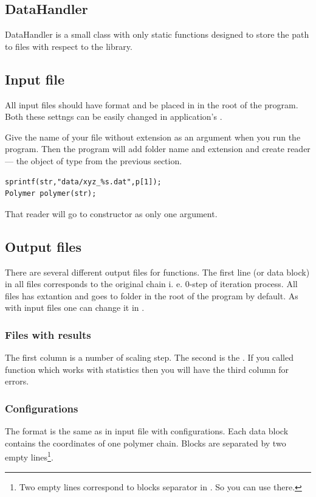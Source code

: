 \documentclass[12pt]{article}
\begin{document}
\begin{mySection}
\subsection{DataHandler}\label{sec:dataHandler}
DataHandler is a small class with only static functions designed to store the path to files with respect to the \PCA library.
\subsection{Input file}\label{sec:inputFile}

All input files should have  format and be placed in  in the root of the program.  Both these settngs can be easily changed in application's .

Give the name of your file without extension as an argument when you run the program. Then the program will add folder name and extension and create reader — the object of type from the previous section.
\begin{lstlisting}
sprintf(str,"data/xyz_%s.dat",p[1]);
Polymer polymer(str);
\end{lstlisting}

That reader will go to  constructor as only one argument.


\subsection{Output files}\label{ssec:outputFiles}
There are several different output files for  functions. The first line (or data block) in all files corresponds to the original chain i. e. 0-step of iteration process.
All files has  extantion and goes to  folder in the root of the program by default. As with input files one can change it in .

\subsubsection{Files with results}
The first column is a number of scaling step. The second is the . If you called   function which works with statistics then you will have the third column for errors.

\subsubsection{Configurations}
The format is the same as in input file with configurations. Each data block contains the coordinates of one polymer chain. Blocks are separated by two empty lines\footnote{Two empty lines correspond to blocks separator in . So you can use  there.}.


\end{mySection}
\end{document}
